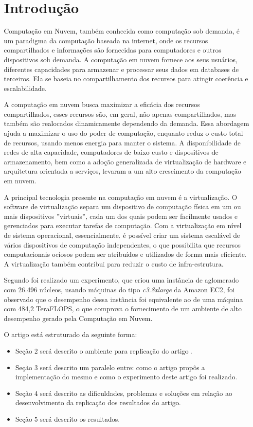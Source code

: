 \section{Introdução}

Computação em Nuvem, também conhecida como computação sob demanda, é um paradigma da computação baseada na internet, onde os recursos compartilhados e informações são fornecidas para computadores e outros dispositivos sob demanda. A computação em nuvem fornece aos seus usuários, diferentes capacidades para armazenar e processar seus dados em databases de terceiros. Ela se baseia no compartilhamento dos recursos para atingir coerência e escalabilidade.

A computação em nuvem busca maximizar a eficácia dos recursos compartilhados, esses recursos são, em geral, não apenas compartilhados, mas também são realocados dinamicamente dependendo da demanda. Essa abordagem ajuda a maximizar o uso do poder de computação, enquanto reduz o custo total de recursos, usando menos energia para manter o sistema. A disponibilidade de redes de alta capacidade, computadores de baixo custo e dispositivos de armazenamento, bem como a adoção generalizada de virtualização de hardware e arquitetura orientada a serviços, levaram a um alto crescimento da computação em nuvem.

A principal tecnologia presente na computação em nuvem é a virtualização. O software de virtualização separa um dispositivo de computação física em um ou mais dispositivos ''virtuais'', cada um dos quais podem ser facilmente usados e gerenciados para executar tarefas de computação. Com a virtualização em nível de sistema operacional, essencialmente, é possível criar um sistema escalável de vários dispositivos de computação independentes, o que possibilita que recursos computacionais ociosos podem ser atribuídos e utilizados de forma mais eficiente. A virtualização também contribui para reduzir o custo de infra-estrutura.

Segundo \cite{elaine_et_al:14} foi realizado um experimento, que criou uma instância de aglomerado com 26.496 núcleos, usando máquinas do tipo \textit{c3.8xlarge} da Amazon EC2, foi observado que o desempenho dessa instância foi equivalente ao de uma máquina com 484,2 TeraFLOPS, o que comprova o fornecimento de um ambiente de alto desempenho gerado pela Computação em Nuvem.

O artigo está estruturado da seguinte forma:
\begin{itemize}
  \item Seção 2 será descrito o ambiente para replicação do artigo \cite{elaine_et_al:14}.
  \item Seção 3 será descrito um paralelo entre: como o artigo propôs a implementação do mesmo e como o experimento deste artigo foi realizado.
  \item Seção 4 será descrito as dificuldades, problemas e soluções em relação ao desenvolvimento da replicação dos resultados do artigo.
  \item Seção 5 será descrito os resultados.
\end{itemize}
